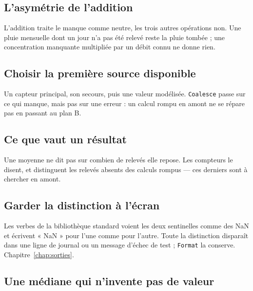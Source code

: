 

\subsection{L'asymétrie de l'addition}

L'addition traite le manque comme neutre, les trois autres opérations
non. Une pluie mensuelle dont un jour n'a pas été relevé reste la pluie
tombée ; une concentration manquante multipliée par un débit connu ne
donne rien.



\subsection{Choisir la première source disponible}

Un capteur principal, son secours, puis une valeur modélisée.
\texttt{Coalesce} passe sur ce qui manque, mais pas sur une erreur : un
calcul rompu en amont ne se répare pas en passant au plan B.



\subsection{Ce que vaut un résultat}

Une moyenne ne dit pas sur combien de relevés elle repose. Les
compteurs le disent, et distinguent les relevés absents des calculs
rompus --- ces derniers sont à chercher en amont.



\subsection{Garder la distinction à l'écran}

Les verbes de la bibliothèque standard voient les deux sentinelles
comme des NaN et écrivent « NaN » pour l'une comme pour l'autre. Toute
la distinction disparaît dans une ligne de journal ou un message
d'échec de test ; \texttt{Format} la conserve.
Chapitre~\ref{chap:sorties}.



\subsection{Une médiane qui n'invente pas de valeur}

